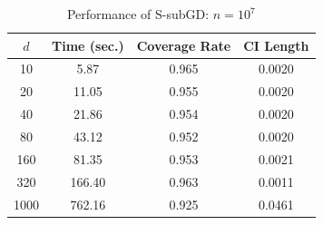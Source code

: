 \documentclass[beamer, t]{beamer}
\begin{document}
\begin{frame}
	
	\begin{table}[htb]
		\centering
		\caption{Performance of S-subGD: $n=10^7$} 
		\label{tb_SGD_rs}
		\begin{tabular}{cccc
			}
			\hline
			{$d$} & {Time (sec.)} & {Coverage Rate} & {CI Length} \\ 
			\hline
			10 & 5.87 & 0.965 & 0.0020 \\ 
			20 & 11.05 & 0.955 & 0.0020 \\ 
			40 & 21.86 & 0.954 & 0.0020 \\ 
			80 & 43.12 & 0.952 & 0.0020 \\ 
			160 & 81.35 & 0.953 & 0.0021 \\ 
			320 & 166.40 & 0.963 & 0.0011 \\ 
			1000 & 762.16 & 0.925 & 0.0461 \\ 
			\hline
		\end{tabular}
	\end{table}
	
	
\end{frame}
\end{document}
